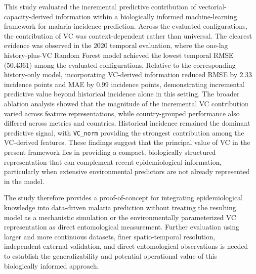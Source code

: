 \documentclass[10pt,twocolumn]{article}
\begin{document}
This study evaluated the incremental predictive contribution of
vectorial-capacity-derived information within a biologically informed
machine-learning framework for malaria-incidence prediction. Across
the evaluated configurations, the contribution of VC was
context-dependent rather than universal. The clearest evidence was
observed in the 2020 temporal evaluation, where the one-lag
history-plus-VC Random Forest model achieved the lowest temporal RMSE
(50.4361) among the evaluated configurations. Relative to the
corresponding history-only model, incorporating VC-derived information
reduced RMSE by 2.33 incidence points and MAE by 0.99 incidence
points, demonstrating incremental predictive value beyond historical
incidence alone in this setting. The broader ablation analysis showed that the magnitude of the incremental VC contribution varied across feature representations,
while country-grouped performance also differed across metrics and
countries. Historical incidence remained the dominant predictive
signal, with \texttt{VC\_norm} providing the strongest contribution
among the VC-derived features. These findings suggest that the
principal value of VC in the present framework lies in providing a
compact, biologically structured representation that can complement
recent epidemiological information, particularly when extensive
environmental predictors are not already represented in the model.

The study therefore provides a proof-of-concept for integrating
epidemiological knowledge into data-driven malaria prediction without
treating the resulting model as a mechanistic simulation or the
environmentally parameterized VC representation as direct
entomological measurement. Further evaluation using larger and more
continuous datasets, finer spatio-temporal resolution, independent
external validation, and direct entomological observations is needed
to establish the generalizability and potential operational value of
this biologically informed approach.

\printbibliography[title={References}]
\end{document}

